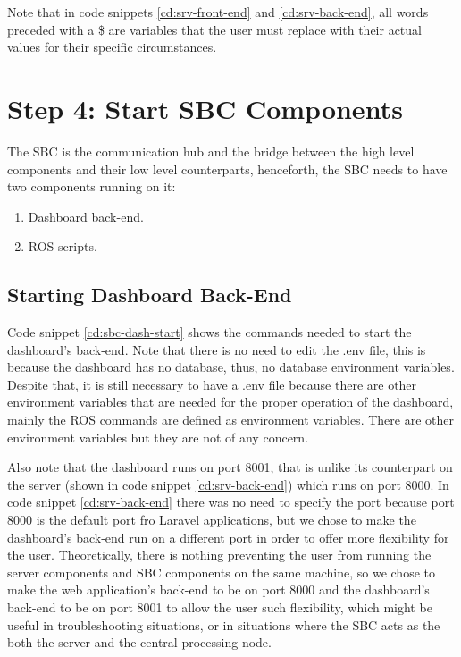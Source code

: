 Note that in code snippets \ref{cd:srv-front-end} and \ref{cd:srv-back-end}, all words preceded with a \$ are variables that the user must replace with their actual values for their specific circumstances. 
\newpage
\section{Step 4: Start SBC Components}
The SBC is the communication hub and the bridge between the high level components and their low level counterparts, henceforth, the SBC needs to have two components running on it:
\begin{enumerate}
	\item Dashboard back-end.
	\item ROS scripts.
\end{enumerate}
\subsection{Starting Dashboard Back-End}
Code snippet \ref{cd:sbc-dash-start} shows the commands needed to start the dashboard's back-end. Note that there is no need to edit the .env file, this is because the dashboard has no database, thus, no database environment variables. Despite that, it is still necessary to have a .env file because there are other environment variables that are needed for the proper operation of the dashboard, mainly the ROS commands are defined as environment variables. There are other environment variables but they are not of any concern.

Also note that the dashboard runs on port 8001, that is unlike its counterpart on the server (shown in code snippet \ref{cd:srv-back-end}) which runs on port 8000. In code snippet \ref{cd:srv-back-end} there was no need to specify the port because port 8000 is the default port fro Laravel applications, but we chose to make the dashboard's back-end run on a different port in order to offer more flexibility for the user. Theoretically, there is nothing preventing the user from running the server components and SBC components on the same machine, so we chose to make the web application's back-end to be on port 8000 and the dashboard's back-end to be on port 8001 to allow the user such flexibility, which might be useful in troubleshooting situations, or in situations where the SBC acts as the both the server and the central processing node.


